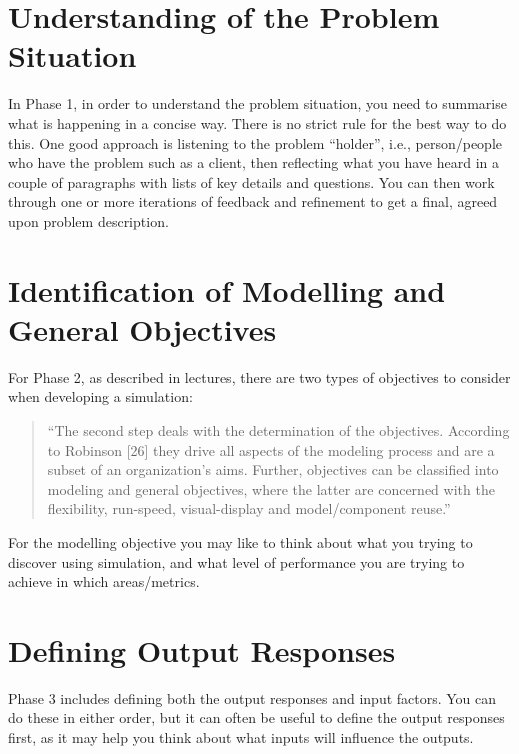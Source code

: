 \documentclass[
  10pt,
  a4paperpaper,
  DIV=11,
  numbers=noendperiod,
  oneside]{scrreprt}
\begin{document}
\section{Understanding of the Problem
Situation}\label{understanding-of-the-problem-situation}

In Phase 1, in order to understand the problem situation, you need to
summarise what is happening in a concise way. There is no strict rule
for the best way to do this. One good approach is listening to the
problem ``holder'', i.e., person/people who have the problem such as a
client, then reflecting what you have heard in a couple of paragraphs
with lists of key details and questions. You can then work through one
or more iterations of feedback and refinement to get a final, agreed
upon problem description.

\section{Identification of Modelling and General
Objectives}\label{identification-of-modelling-and-general-objectives}

For Phase 2, as described in lectures, there are two types of objectives
to consider when developing a simulation:

\begin{quote}
``The second step deals with the determination of the objectives.
According to Robinson {[}26{]} they drive all aspects of the modeling
process and are a subset of an organization's aims. Further, objectives
can be classified into modeling and general objectives, where the latter
are concerned with the flexibility, run-speed, visual-display and
model/component reuse.''
\end{quote}

For the modelling objective you may like to think about what you trying
to discover using simulation, and what level of performance you are
trying to achieve in which areas/metrics.

\section{Defining Output Responses}\label{defining-output-responses}

Phase 3 includes defining both the output responses and input factors.
You can do these in either order, but it can often be useful to define
the output responses first, as it may help you think about what inputs
will influence the outputs.
\end{document}
